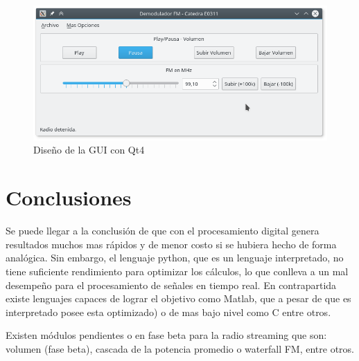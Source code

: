 \begin{figure}[ht!]
	\centering
	\includegraphics[scale=0.7]{./imagenes/gui.png}
	\caption{Diseño de la GUI con Qt4}
	\label{fig:gui}
\end{figure}

\section{Conclusiones}

Se puede llegar a la conclusión de que con el procesamiento digital genera resultados muchos mas rápidos y de menor costo si se hubiera hecho de forma analógica.
Sin embargo, el lenguaje python, que es un lenguaje interpretado, no tiene suficiente rendimiento para optimizar los cálculos, lo que conlleva a un mal desempeño para el procesamiento de señales en tiempo real. En contrapartida existe lenguajes capaces de lograr el objetivo como Matlab, que a pesar de que es interpretado posee esta optimizado) o de mas bajo nivel como C entre otros.

Existen módulos pendientes o en fase beta para la radio streaming que son: volumen (fase beta), cascada de la potencia promedio o waterfall FM, entre otros.
